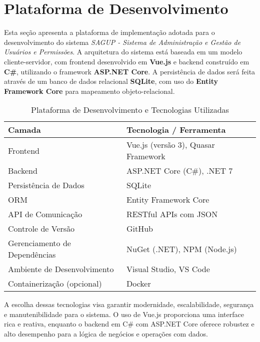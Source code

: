 \chapter{Plataforma de Desenvolvimento}
\label{sec-plataforma}
\vspace{-1cm}

Esta seção apresenta a plataforma de implementação adotada para o desenvolvimento do sistema \emph{SAGUP - Sistema de Administração e Gestão de Usuários e Permissões}. A arquitetura do sistema está baseada em um modelo cliente-servidor, com frontend desenvolvido em \textbf{Vue.js} e backend construído em \textbf{C\#}, utilizando o framework \textbf{ASP.NET Core}. A persistência de dados será feita através de um banco de dados relacional \textbf{SQLite}, com uso do \textbf{Entity Framework Core} para mapeamento objeto-relacional.

\begin{table}[H]
\centering
\caption{Plataforma de Desenvolvimento e Tecnologias Utilizadas}
\label{tabela-plataforma}
\begin{tabular}{|p{4.5cm}|p{7.5cm}|}
\hline
\textbf{Camada} & \textbf{Tecnologia / Ferramenta} \\
\hline
Frontend & Vue.js (versão 3), Quasar Framework \\
\hline
Backend & ASP.NET Core (C\#), .NET 7 \\
\hline
Persistência de Dados & SQLite \\
\hline
ORM & Entity Framework Core \\
\hline
API de Comunicação & RESTful APIs com JSON \\
\hline
Controle de Versão & GitHub \\
\hline
Gerenciamento de Dependências & NuGet (.NET), NPM (Node.js) \\
\hline
Ambiente de Desenvolvimento & Visual Studio, VS Code \\
\hline
Containerização (opcional) & Docker \\
\hline
\end{tabular}
\end{table}

A escolha dessas tecnologias visa garantir modernidade, escalabilidade, segurança e manutenibilidade para o sistema. O uso de Vue.js proporciona uma interface rica e reativa, enquanto o backend em C\# com ASP.NET Core oferece robustez e alto desempenho para a lógica de negócios e operações com dados.
